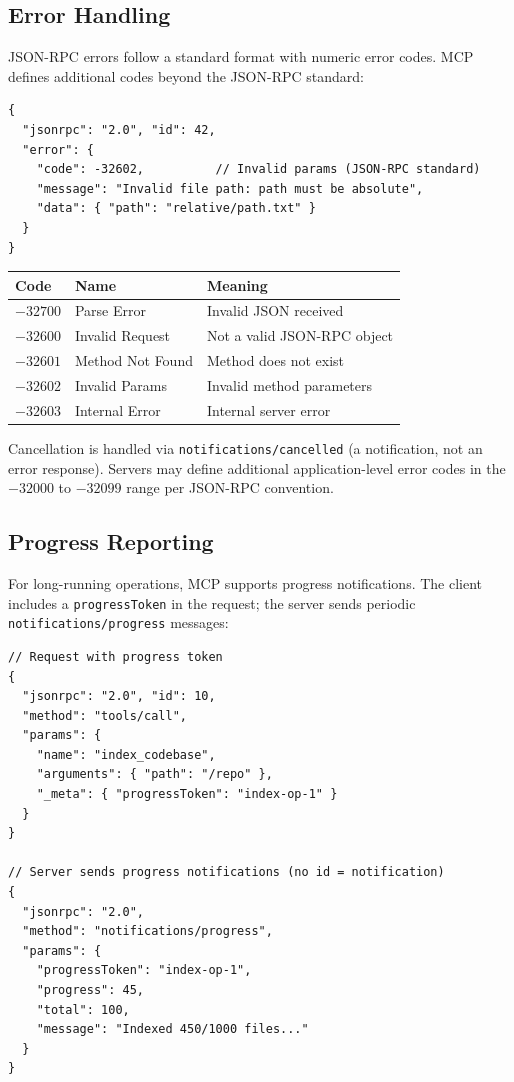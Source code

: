 \subsection{Error Handling}
\label{error-handling}

JSON-RPC errors follow a standard format with numeric error codes. MCP defines additional codes beyond the JSON-RPC standard:

\begin{lstlisting}[style=pythonstyle]
{
  "jsonrpc": "2.0", "id": 42,
  "error": {
    "code": -32602,          // Invalid params (JSON-RPC standard)
    "message": "Invalid file path: path must be absolute",
    "data": { "path": "relative/path.txt" }
  }
}
\end{lstlisting}

\begin{keybox}
\begin{tabular}{@{}lp{5cm}p{8cm}@{}}
\toprule
\textbf{Code} & \textbf{Name} & \textbf{Meaning} \\
\midrule
$-32700$ & Parse Error & Invalid JSON received \\
$-32600$ & Invalid Request & Not a valid JSON-RPC object \\
$-32601$ & Method Not Found & Method does not exist \\
$-32602$ & Invalid Params & Invalid method parameters \\
$-32603$ & Internal Error & Internal server error \\
\bottomrule
\end{tabular}

Cancellation is handled via \texttt{notifications/cancelled} (a notification, not an error response). Servers may define additional application-level error codes in the $-32000$ to $-32099$ range per JSON-RPC convention.
\end{keybox}

\subsection{Progress Reporting}
\label{progress-reporting}

For long-running operations, MCP supports progress notifications. The client includes a \texttt{progressToken} in the request; the server sends periodic \texttt{notifications/progress} messages:

\begin{lstlisting}[style=pythonstyle]
// Request with progress token
{
  "jsonrpc": "2.0", "id": 10,
  "method": "tools/call",
  "params": {
    "name": "index_codebase",
    "arguments": { "path": "/repo" },
    "_meta": { "progressToken": "index-op-1" }
  }
}

// Server sends progress notifications (no id = notification)
{
  "jsonrpc": "2.0",
  "method": "notifications/progress",
  "params": {
    "progressToken": "index-op-1",
    "progress": 45,
    "total": 100,
    "message": "Indexed 450/1000 files..."
  }
}
\end{lstlisting}

